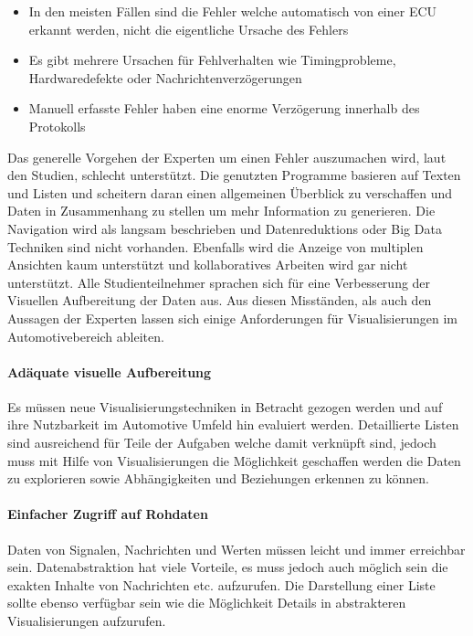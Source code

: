 \documentclass[draft=false
              ,paper=a4
              ,twoside=false
              ,fontsize=11pt
              ,headsepline
              ,BCOR10mm
              ,DIV11
              ]{scrbook}
\begin{document}
\begin{itemize}
  \item In den meisten Fällen sind die Fehler welche automatisch von einer ECU erkannt werden, nicht die eigentliche Ursache des Fehlers
  \item Es gibt mehrere Ursachen für Fehlverhalten wie Timingprobleme, Hardwaredefekte oder Nachrichtenverzögerungen
  \item Manuell erfasste Fehler haben eine enorme Verzögerung innerhalb des Protokolls 
\end{itemize}

Das generelle Vorgehen der Experten um einen Fehler auszumachen wird, laut den Studien, schlecht unterstützt. Die genutzten Programme basieren auf Texten und Listen und scheitern daran einen allgemeinen Überblick zu verschaffen und Daten in Zusammenhang zu stellen um mehr Information zu generieren. Die Navigation wird als langsam beschrieben und Datenreduktions oder Big Data Techniken sind nicht vorhanden. Ebenfalls wird die Anzeige von multiplen Ansichten kaum unterstützt und kollaboratives Arbeiten wird gar nicht unterstützt. Alle Studienteilnehmer sprachen sich für eine Verbesserung der Visuellen Aufbereitung der Daten aus. Aus diesen Misständen, als auch den Aussagen der Experten lassen sich einige Anforderungen für Visualisierungen im Automotivebereich ableiten. 

\paragraph{Adäquate visuelle Aufbereitung} %
\label{par:adaquate_visuelle_aufbereitung}
Es müssen neue Visualisierungstechniken in Betracht gezogen werden und auf ihre Nutzbarkeit im Automotive Umfeld hin evaluiert werden. Detaillierte Listen sind ausreichend für Teile der Aufgaben welche damit verknüpft sind, jedoch muss mit Hilfe von Visualisierungen die Möglichkeit geschaffen werden die Daten zu explorieren sowie Abhängigkeiten und Beziehungen erkennen zu können. 
\paragraph{Einfacher Zugriff auf Rohdaten} %
\label{par:einfacher_zugriff_auf_rohdaten}
Daten von Signalen, Nachrichten und Werten müssen leicht und immer erreichbar sein. Datenabstraktion hat viele Vorteile, es muss jedoch auch möglich sein die exakten Inhalte von Nachrichten etc. aufzurufen. Die Darstellung einer Liste sollte ebenso verfügbar sein wie die Möglichkeit Details in abstrakteren Visualisierungen aufzurufen.
\end{document}
